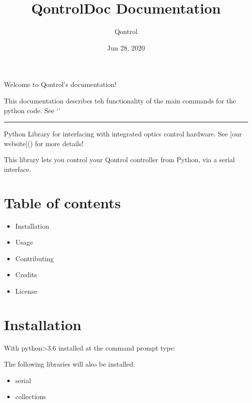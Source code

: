 \documentclass[letterpaper,10pt,english]{sphinxmanual}
\title{QontrolDoc Documentation}
\date{Jun 28, 2020}
\author{Qontrol}
\begin{document}
\maketitle
\sphinxtableofcontents
{}\label{\detokenize{index::doc}}
Welcome to Qontrol’s documentation!

This documentation describes teh functionality of the main commands for the python  code.
See ‘’


\bigskip\hrule\bigskip




Python Library for interfacing with  integrated optics control hardware. See {[}our website{]}() for more details!

This library lets you control your Qontrol controller from Python, via a serial interface.


\chapter{Table of contents}
\label{\detokenize{includeme:qontrol-api}}\label{\detokenize{includeme::doc}}\label{\detokenize{includeme:table-of-contents}}\begin{itemize}
\item {} 
Installation

\item {} 
Usage

\item {} 
Contributing

\item {} 
Credits

\item {} 
License

\end{itemize}


\chapter{Installation}
\label{\detokenize{includeme:installation}}
With python\textgreater{}3.6 installed at the command prompt type:


The following libraries will also be installed:
\begin{itemize}
\item {} 
serial

\item {} 
collections

\end{itemize}
\end{document}
